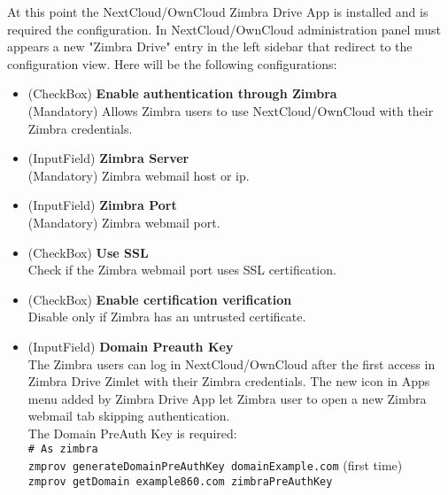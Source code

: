     At this point the NextCloud/OwnCloud Zimbra Drive App is installed and is required the configuration.
    In NextCloud/OwnCloud administration panel must appears a new "Zimbra Drive" entry in the left sidebar
    that redirect to the configuration view. Here will be the following configurations:
    \begin{itemize}
        \item (CheckBox) \textbf{Enable authentication through Zimbra}\\
        (Mandatory) Allows Zimbra users to use NextCloud/OwnCloud with their Zimbra credentials.
        \item (InputField) \textbf{Zimbra Server}\\
        (Mandatory) Zimbra webmail host or ip.
        \item (InputField) \textbf{Zimbra Port}\\
        (Mandatory) Zimbra webmail port.
        \item (CheckBox) \textbf{Use SSL}\\
        Check if the Zimbra webmail port uses SSL certification.
        \item (CheckBox) \textbf{Enable certification verification}\\
        Disable only if Zimbra has an untrusted certificate.
        \item (InputField) \textbf{Domain Preauth Key}\\
        The Zimbra users can log in NextCloud/OwnCloud after the first access in Zimbra Drive Zimlet
        with their Zimbra credentials. The new icon in Apps menu added by Zimbra Drive App let 
        Zimbra user to open a new Zimbra webmail tab skipping authentication.\\
        The Domain PreAuth Key is required:\\
        \texttt{\# As zimbra}\\
        \texttt{zmprov generateDomainPreAuthKey domainExample.com} (first time)\\
        \texttt{zmprov getDomain example860.com zimbraPreAuthKey}
    \end{itemize}
